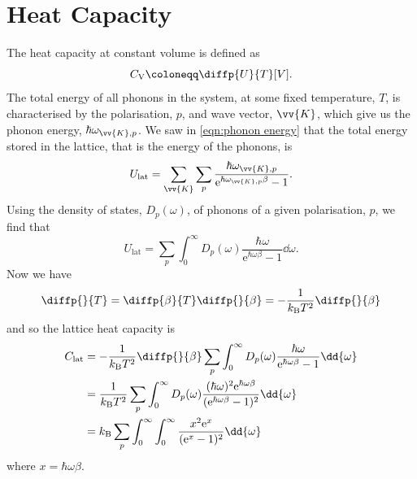\documentclass[fleqn]{NotesClass}
\newcommand*{\boltzmann}{k_{\mathrm{B}}}
\newcommand*{\e}{\mathrm{e}}
\newcommand*{\heatCapacityVolume}{C_{\mathrm{V}}}
\begin{document}
    \section{Heat Capacity}
    The heat capacity at constant volume is defined as
    \begin{equation}
        \heatCapacityVolume \coloneqq \diffp{U}{T}[V].
    \end{equation}
    The total energy of all phonons in the system, at some fixed temperature, \(T\), is characterised by the polarisation, \(p\), and wave vector, \(\vv{K}\), which give us the phonon energy, \(\hbar\omega_{\vv{K}, p}\).
    We saw in \cref{eqn:phonon energy} that the total energy stored in the lattice, that is the energy of the phonons, is
    \begin{equation}
        U_{\mathrm{lat}} = \sum_{\vv{K}} \sum_{p} \frac{\hbar\omega_{\vv{K}, p}}{\e^{\hbar\omega_{\vv{K}, p}\beta} - 1}.
    \end{equation}
    Using the density of states, \(D_p(\omega)\), of phonons of a given polarisation, \(p\), we find that
    \begin{equation}
        U_{\mathrm{lat}} = \sum_{p} \int_{0}^{\infty} D_p(\omega) \frac{\hbar\omega}{\e^{\hbar\omega\beta} - 1} \dd{\omega}.
    \end{equation}
    Now we have
    \begin{equation}
        \diffp{}{T} = \diffp{\beta}{T}\diffp{}{\beta} = -\frac{1}{\boltzmann T^2}\diffp{}{\beta}
    \end{equation}
    and so the lattice heat capacity is
    \begin{align}
        C_{\mathrm{lat}} &= -\frac{1}{\boltzmann T^2} \diffp{}{\beta} \sum_{p} \int_{0}^{\infty} D_p(\omega) \frac{\hbar\omega}{\e^{\hbar\omega\beta} - 1}\dd{\omega}\\
        &= \frac{1}{\boltzmann T^2} \sum_{p} \int_{0}^{\infty} D_p(\omega) \frac{(\hbar\omega)^2 \e^{\hbar\omega\beta}}{(\e^{\hbar\omega\beta} - 1)^2} \dd{\omega}\\
        &= \boltzmann \sum_p \int_{0}^{\infty} \int_0^{\infty} \frac{x^2\e^x}{(\e^x - 1)^2} \dd{\omega}
    \end{align}
    where \(x = \hbar\omega\beta\).
    
\end{document}
